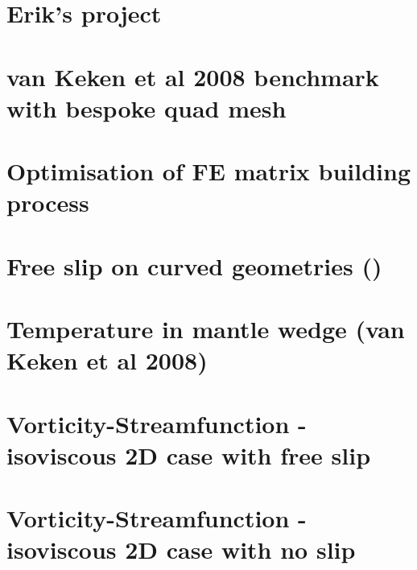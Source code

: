 \documentclass[a4paper,11pt]{report}
\begin{document}
\chapter{Erik's project \label{f148}} %

\chapter{van Keken et al 2008 benchmark with bespoke quad mesh\label{f149}} %

\chapter{Optimisation of FE matrix building process \label{f150}} %

\chapter{Free slip on curved geometries (\QtwoQone)\label{f151}} %

\chapter{Temperature in mantle wedge (van Keken et al 2008) \label{f152}} %

\chapter{Vorticity-Streamfunction - isoviscous 2D case with free slip\label{f153}} %

\chapter{Vorticity-Streamfunction - isoviscous 2D case with no slip\label{f154}} %
\end{document}
